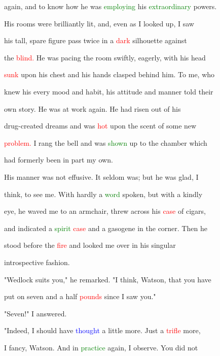  again, and to know how he was \textcolor{green}{employing} his \textcolor{green}{extraordinary} powers.

 His rooms were brilliantly lit, and, even as I looked up, I saw

 his tall, spare figure pass twice in a \textcolor{red}{dark} silhouette against

 the \textcolor{red}{blind.} He was pacing the room swiftly, eagerly, with his head

 \textcolor{red}{sunk} upon his chest and his hands clasped behind him. To me, who

 knew his every mood and habit, his attitude and manner told their

 own story. He was at work again. He had risen out of his

 drug-created dreams and was \textcolor{red}{hot} upon the scent of some new

 \textcolor{red}{problem.} I rang the bell and was \textcolor{green}{shown} up to the chamber which

 had formerly been in part my own.



 His manner was not effusive. It seldom was; but he was \textcolor{BurntOrange}{glad,} I

 think, to see me. With hardly a \textcolor{green}{word} spoken, but with a kindly

 eye, he waved me to an armchair, threw across his \textcolor{red}{case} of cigars,

 and indicated a \textcolor{green}{spirit} \textcolor{red}{case} and a gasogene in the corner. Then he

 stood before the \textcolor{red}{fire} and looked me over in his singular

 introspective fashion.



 "Wedlock suits you," he remarked. "I think, Watson, that you have

 put on seven and a half \textcolor{red}{pounds} since I saw you."



 "Seven!" I answered.



 "Indeed, I should have \textcolor{blue}{thought} a little more. Just a \textcolor{red}{trifle} more,

 I \textcolor{BurntOrange}{fancy,} Watson. And in \textcolor{green}{practice} again, I observe. You did not


